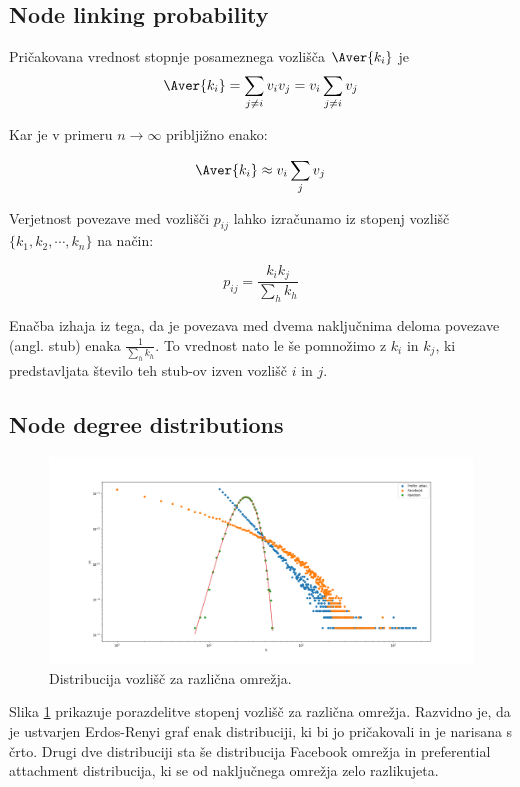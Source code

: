 \documentclass[a4paper,11pt]{article}
\begin{document}
\subsection{Node linking probability}

Pričakovana vrednost stopnje posameznega vozlišča $\Aver{k_i}$ je
\[\Aver{k_i} = \sum_{j \neq i} v_i v_j = v_i\sum_{j \neq i}v_j\]

Kar je v primeru $n\to\infty$ pribljižno enako:

\[\Aver{k_i} \approx v_i\sum_{j}v_j\]

Verjetnost povezave med vozlišči $p_{ij}$ lahko izračunamo iz stopenj vozlišč $\{k_1, k_2, \cdots, k_n\}$ na način:

\[p_{ij} = \frac{k_ik_j}{\sum_h k_h}\]

Enačba izhaja iz tega, da je povezava med dvema naključnima deloma povezave (angl. stub) enaka $\frac{1}{\sum_h k_h}$. To vrednost nato le še pomnožimo z $k_i$ in $k_j$, ki predstavljata število teh stub-ov izven vozlišč $i$ in $j$.

\subsection{Node degree distributions }



\begin{figure}[htbp]
\begin{center}
\includegraphics[scale=0.27]{distr.png}
\caption{Distribucija vozlišč za različna omrežja.}
\label{distr}
\end{center}
\end{figure}

Slika \ref{distr} prikazuje porazdelitve stopenj vozlišč za različna omrežja. Razvidno je, da je ustvarjen Erdos-Renyi graf enak distribuciji, ki bi jo pričakovali in je narisana s črto. Drugi dve distribuciji sta še distribucija Facebook omrežja in preferential attachment distribucija, ki se od naključnega omrežja zelo razlikujeta.
\end{document}
